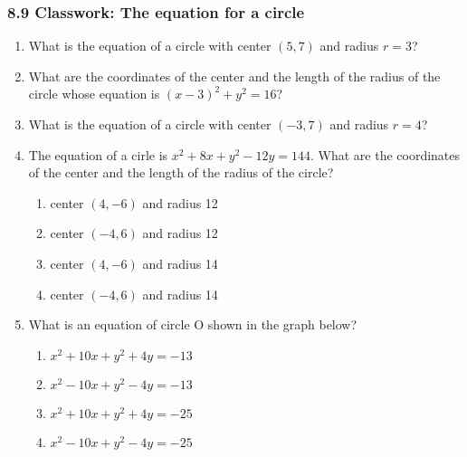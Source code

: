 \documentclass[12pt, twoside]{article}
\begin{document}
\subsubsection*{8.9 Classwork: The equation for a circle}
 \begin{enumerate}%

  \item What is the equation of a circle with center $(5,7)$ and radius $r=3$? \vspace{1cm}

  \item What are the coordinates of the center and the length of the radius of the circle whose equation is $(x-3)^2+y^2=16$? \vspace{1cm}

  \item What is the equation of a circle with center $(-3,7)$ and radius $r=4$?\vspace{1cm}
  
  \item %
  The equation of a cirle is $x^2+8x+y^2-12y=144$. What are the coordinates of the center and the length of the radius of the circle?
    \begin{enumerate}
      \item center $(4,-6)$ and radius 12
      \item center $(-4,6)$ and radius 12
      \item center $(4,-6)$ and radius 14
      \item center $(-4,6)$ and radius 14
    \end{enumerate}

  \item %
  What is an equation of circle O shown in the graph below?
  \begin{center}
  \end{center}
  \begin{multicols}{2}
    \begin{enumerate}
      \item $x^2+10x+y^2+4y=-13$
      \item $x^2-10x+y^2-4y=-13$
      \item $x^2+10x+y^2+4y=-25$
      \item $x^2-10x+y^2-4y=-25$
    \end{enumerate}
  \end{multicols}


\end{enumerate}
\end{document}

